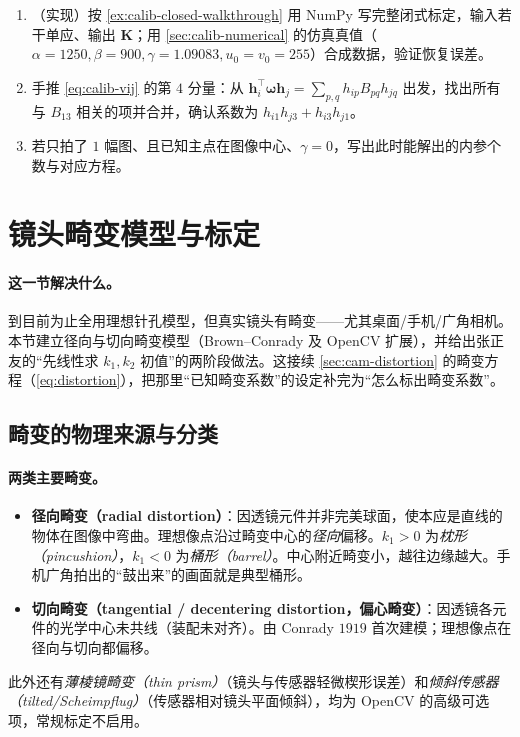 \begin{practice}[练习]
\begin{enumerate}
  \item （实现）按 \cref{ex:calib-closed-walkthrough} 用 NumPy 写完整闭式标定，输入若干单应、输出 $\mathbf{K}$；用 \cref{sec:calib-numerical} 的仿真真值（$\alpha=1250,\beta=900,\gamma=1.09083,u_0=v_0=255$）合成数据，验证恢复误差。
  \item 手推 \cref{eq:calib-vij} 的第 $4$ 分量：从 $\mathbf{h}_i^\top\boldsymbol{\omega}\mathbf{h}_j=\sum_{p,q}h_{ip}B_{pq}h_{jq}$ 出发，找出所有与 $B_{13}$ 相关的项并合并，确认系数为 $h_{i1}h_{j3}+h_{i3}h_{j1}$。
  \item 若只拍了 $1$ 幅图、且已知主点在图像中心、$\gamma=0$，写出此时能解出的内参个数与对应方程。
\end{enumerate}
\end{practice}

\section{镜头畸变模型与标定}
\label{sec:calib-distortion}

\paragraph{这一节解决什么。}
到目前为止全用理想针孔模型，但真实镜头有畸变——尤其桌面/手机/广角相机。本节建立径向与切向畸变模型（Brown--Conrady 及 OpenCV 扩展），并给出张正友的“先线性求 $k_1,k_2$ 初值”的两阶段做法。这接续 \cref{sec:cam-distortion} 的畸变方程（\cref{eq:distortion}），把那里“已知畸变系数”的设定补完为“怎么标出畸变系数”。

\subsection{畸变的物理来源与分类}

\paragraph{两类主要畸变。}
\begin{itemize}
  \item \textbf{径向畸变（radial distortion）}：因透镜元件并非完美球面，使本应是直线的物体在图像中弯曲。理想像点沿过畸变中心的\emph{径向}偏移。$k_1>0$ 为\emph{枕形（pincushion）}，$k_1<0$ 为\emph{桶形（barrel）}\cite{vorobyev2023distortion}。中心附近畸变小，越往边缘越大。手机广角拍出的“鼓出来”的画面就是典型桶形。
  \item \textbf{切向畸变（tangential / decentering distortion，偏心畸变）}：因透镜各元件的光学中心未共线（装配未对齐）。由 Conrady $1919$ 首次建模\cite{tangram2021brown}；理想像点在径向与切向都偏移。
\end{itemize}
此外还有\emph{薄棱镜畸变（thin prism）}（镜头与传感器轻微楔形误差）和\emph{倾斜传感器（tilted/Scheimpflug）}（传感器相对镜头平面倾斜），均为 OpenCV 的高级可选项，常规标定不启用。

